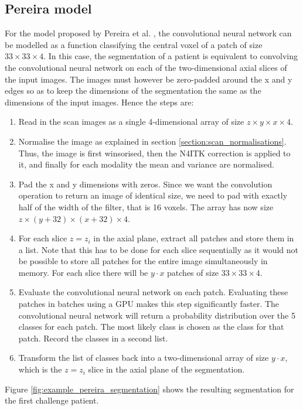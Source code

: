 \documentclass[12pt,a4paper,twoside,openright]{report}
\begin{document}
\subsection{Pereira model}
For the model proposed by Pereira et al. \cite{pereira}, the convolutional neural network can be modelled as a function classifying the central voxel of a patch of size $33 \times 33 \times 4$. In this case, the segmentation of a patient is equivalent to convolving the convolutional neural network on each of the two-dimensional axial slices of the input images. The images must however be zero-padded around the x and y edges so as to keep the dimensions of the segmentation the same as the dimensions of the input images. Hence the steps are:
\begin{enumerate}
	\item Read in the scan images as a single 4-dimensional array of size $z \times y \times x \times 4$.
	\item Normalise the image as explained in section \ref{section:scan_normalisations}. Thus, the image is first winsorised, then the N4ITK correction is applied to it, and finally for each modality the mean and variance are normalised.
	\item Pad the x and y dimensions with zeros. Since we want the convolution operation to return an image of identical size, we need to pad with exactly half of the width of the filter, that is 16 voxels. The array has now size $z \times (y + 32) \times (x + 32) \times 4$.
	\item For each slice $z = z_i$ in the axial plane, extract all patches and store them in a list. Note that this has to be done for each slice sequentially as it would not be possible to store all patches for the entire image simultaneously in memory. For each slice there will be $y \cdot x$ patches of size $33 \times 33 \times 4$.
	\item Evaluate the convolutional neural network on each patch. Evaluating these patches in batches using a GPU makes this step significantly faster. The convolutional neural network will return a probability distribution over the 5 classes for each patch. The most likely class is chosen as the class for that patch. Record the classes in a second list.
	\item Transform the list of classes back into a two-dimensional array of size $y \cdot x$, which is the $z = z_i$ slice in the axial plane of the segmentation.
\end{enumerate}

Figure \ref{fig:example_pereira_segmentation} shows the resulting segmentation for the first challenge patient.
\end{document}
